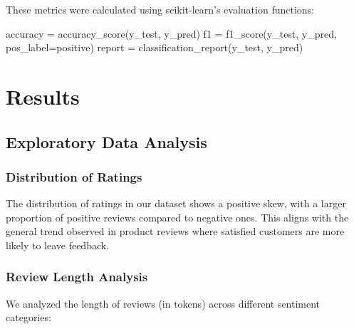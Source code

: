 \documentclass[
]{article}
\newenvironment{Shaded}{\begin{snugshade}}{\end{snugshade}}
\newcommand{\NormalTok}[1]{\textcolor[rgb]{0.00,0.23,0.31}{#1}}
\newcommand{\OperatorTok}[1]{\textcolor[rgb]{0.37,0.37,0.37}{#1}}
\newcommand{\StringTok}[1]{\textcolor[rgb]{0.13,0.47,0.30}{#1}}
\begin{document}
These metrics were calculated using scikit-learn's evaluation functions:

\begin{Shaded}
\begin{Highlighting}[]
\NormalTok{accuracy }\OperatorTok{=}\NormalTok{ accuracy\_score(y\_test, y\_pred)}
\NormalTok{f1 }\OperatorTok{=}\NormalTok{ f1\_score(y\_test, y\_pred, pos\_label}\OperatorTok{=}\StringTok{\textquotesingle{}positive\textquotesingle{}}\NormalTok{)}
\NormalTok{report }\OperatorTok{=}\NormalTok{ classification\_report(y\_test, y\_pred)}
\end{Highlighting}
\end{Shaded}

\section{Results}\label{results}

\subsection{Exploratory Data Analysis}\label{exploratory-data-analysis}

\subsubsection{Distribution of Ratings}\label{distribution-of-ratings}

The distribution of ratings in our dataset shows a positive skew, with a
larger proportion of positive reviews compared to negative ones. This
aligns with the general trend observed in product reviews where
satisfied customers are more likely to leave feedback.

\subsubsection{Review Length Analysis}\label{review-length-analysis}

We analyzed the length of reviews (in tokens) across different sentiment
categories:
\end{document}
